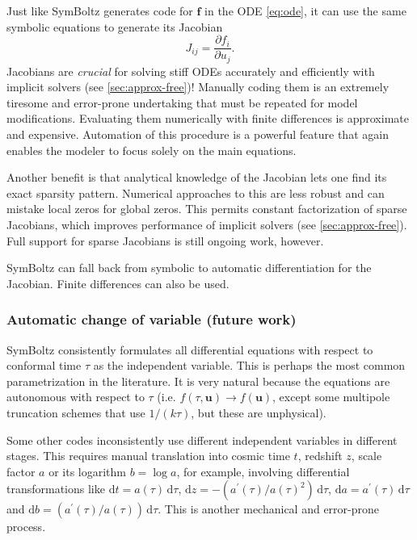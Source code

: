 \documentclass{aa}
\begin{document}
Just like SymBoltz generates code for $\boldsymbol{f}$ in the ODE \eqref{eq:ode}, it can use the same symbolic equations to generate its Jacobian
\begin{equation}
    J_{ij} = \frac{\partial f_i}{\partial u_j}.
\label{eq:jacobian}
\end{equation}
Jacobians are \emph{crucial} for solving stiff ODEs accurately and efficiently with implicit solvers (see \cref{sec:approx-free})!
Manually coding them is an extremely tiresome and error-prone undertaking that must be repeated for model modifications.
Evaluating them numerically with finite differences is approximate and expensive.
Automation of this procedure is a powerful feature that again enables the modeler to focus solely on the main equations.

Another benefit is that analytical knowledge of the Jacobian lets one find its exact sparsity pattern.
Numerical approaches to this are less robust and can mistake local zeros for global zeros.
This permits constant factorization of sparse Jacobians, which improves performance of implicit solvers (see \cref{sec:approx-free}).
Full support for sparse Jacobians is still ongoing work, however.

SymBoltz can fall back from symbolic to automatic differentiation for the Jacobian.
Finite differences can also be used.

\subsubsection{Automatic change of variable (future work)}
\label{sec:changeivar}

SymBoltz consistently formulates all differential equations with respect to conformal time $\tau$ as the independent variable.
This is perhaps the most common parametrization in the literature.
It is very natural because the equations are autonomous with respect to $\tau$ (i.e. $f(\tau,\boldsymbol{u}) \rightarrow f(\boldsymbol{u})$, except some multipole truncation schemes that use $1/(k\tau)$, but these are unphysical).

Some other codes inconsistently use different independent variables in different stages.
This requires manual translation into cosmic time $t$, redshift $z$, scale factor $a$ or its logarithm $b = \log a$, for example,
involving differential transformations like $\mathrm{d}t = a(\tau) \, \mathrm{d}\tau$, $\mathrm{d}z = -(a^\prime(\tau)/a(\tau)^2) \, \mathrm{d}\tau$, $\mathrm{d}a=a^\prime(\tau)\,\mathrm{d}\tau$ and $\mathrm{d}b = (a^\prime(\tau)/a(\tau))\,\mathrm{d}\tau$.
This is another mechanical and error-prone process.
\end{document}
